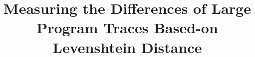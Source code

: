 \documentclass[10pt,journal,cspaper,compsoc]{IEEEtran}
\begin{document}
%
\title{Measuring the Differences of Large Program Traces Based-on
Levenshtein Distance}
%
%
%
%

\end{document}

